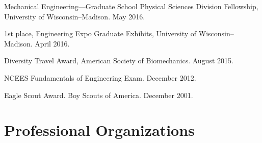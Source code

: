 \documentclass[letterpaper, 10pt]{article}
\begin{document}
\begin{compactitem}
	\item Mechanical Engineering---Graduate School Physical Sciences Division Fellowship, University of Wisconsin--Madison. May 2016.
	\item 1st place, Engineering Expo Graduate Exhibits, University of Wisconsin--Madison. April 2016.
	\item Diversity Travel Award, American Society of Biomechanics. August 2015.
	\item NCEES Fundamentals of Engineering Exam. December 2012.
	\item Eagle Scout Award. Boy Scouts of America. December 2001.
\end{compactitem}


\section{Professional Organizations}
\end{document}
